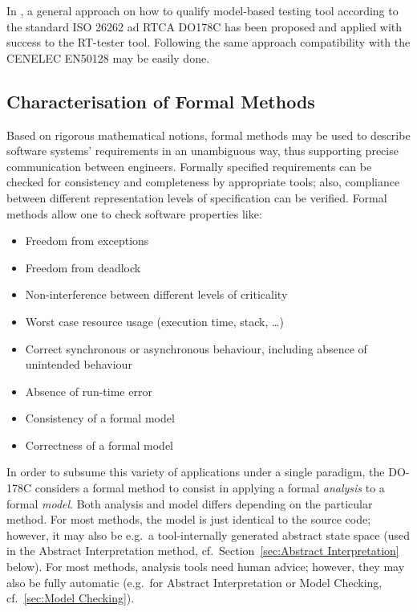 \documentclass{template/openetcs_report}
\begin{document}
In \cite{brauer_efficient_2012}, a general approach  on how to qualify
model-based testing tool according to the standard ISO 26262 ad RTCA
DO178C has been proposed and applied with success to the RT-tester
tool. Following the same  approach compatibility with the CENELEC EN50128
may be easily done. 


\subsection{Characterisation of Formal Methods}

Based on rigorous mathematical notions, formal methods may be used
to describe software systems' requirements in an unambiguous way,
thus supporting precise communication between engineers.
%
Formally specified requirements can be checked for consistency and
completeness by appropriate tools;
also, compliance between different representation levels of
specification can be verified.
%
Formal methods allow one to check software properties like:

\begin{itemize}
\item Freedom from exceptions
\item Freedom from deadlock
\item Non-interference between different levels of criticality
\item Worst case resource usage (execution time, stack, \ldots)
\item Correct synchronous or asynchronous behaviour,
        including absence of unintended behaviour
\item Absence of run-time error
\item Consistency of a formal model
\item Correctness of a formal model
\end{itemize}


In order to subsume this variety of applications under a single
paradigm,
the DO-178C
considers a formal method to consist in applying a
formal {\em analysis} to a formal {\em model}.
%
Both analysis and model differs depending on the particular method.
%
For most methods, the model
is just identical to the source code; however, it may
also be e.g.\ a tool-internally generated abstract state space (used
in the Abstract Interpretation method, cf.\
Section~\ref{sec:Abstract Interpretation} below).
%
For most methods, analysis tools need human advice;
however, they may also be fully automatic (e.g.\ for 
Abstract Interpretation or Model Checking, cf.\
\ref{sec:Model Checking}).
\end{document}
